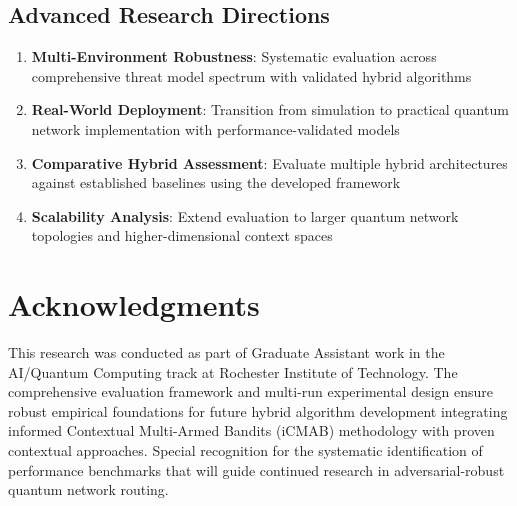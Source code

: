 \documentclass[12pt,a4paper]{article}
\begin{document}
\subsection{Advanced Research Directions}

\begin{enumerate}
\item \textbf{Multi-Environment Robustness}: Systematic evaluation across comprehensive threat model spectrum with validated hybrid algorithms
\item \textbf{Real-World Deployment}: Transition from simulation to practical quantum network implementation with performance-validated models
\item \textbf{Comparative Hybrid Assessment}: Evaluate multiple hybrid architectures against established baselines using the developed framework
\item \textbf{Scalability Analysis}: Extend evaluation to larger quantum network topologies and higher-dimensional context spaces
\end{enumerate}

\section{Acknowledgments}

This research was conducted as part of Graduate Assistant work in the AI/Quantum Computing track at Rochester Institute of Technology. The comprehensive evaluation framework and multi-run experimental design ensure robust empirical foundations for future hybrid algorithm development integrating informed Contextual Multi-Armed Bandits (iCMAB) methodology with proven contextual approaches. Special recognition for the systematic identification of performance benchmarks that will guide continued research in adversarial-robust quantum network routing.
\end{document}
